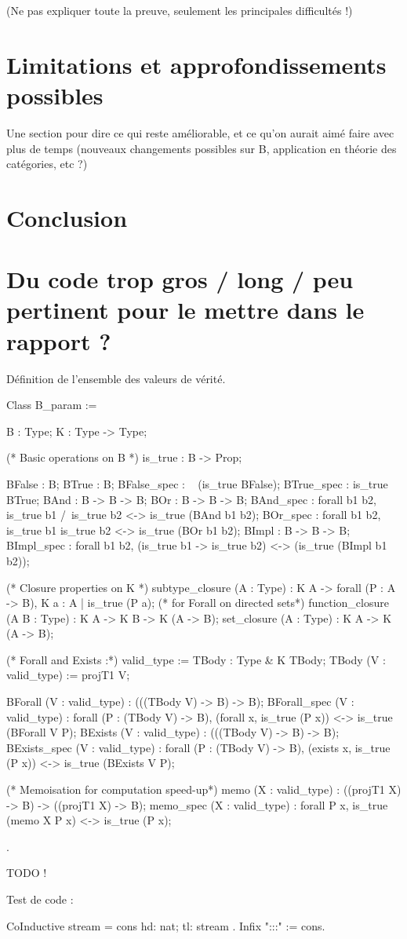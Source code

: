 \documentclass{article}
\theoremstyle{definition}
\begin{document}
(Ne pas expliquer toute la preuve, seulement les principales difficultés !)



\section{Limitations et approfondissements possibles}

Une section pour dire ce qui reste améliorable, et ce qu'on aurait aimé faire avec plus de temps (nouveaux changements possibles sur B, application en théorie des catégories, etc ?)


\section*{Conclusion}





\newpage

\appendix

\section{Du code trop gros / long / peu pertinent pour le mettre dans le rapport ?}
\label{todo}

Définition de l'ensemble des valeurs de vérité.
\begin{coq}
Class B_param := { B : Type;
  K : Type -> Type;
  
  (* Basic operations on B *)
  is_true : B -> Prop;
  
  BFalse : B;
  BTrue : B;
  BFalse_spec : ~ (is_true BFalse);
  BTrue_spec : is_true BTrue;
  BAnd : B -> B -> B;
  BOr : B -> B -> B;
  BAnd_spec : forall b1 b2, is_true b1 /\ is_true b2 <-> is_true (BAnd b1 b2);
  BOr_spec : forall b1 b2, is_true b1 \/ is_true b2 <-> is_true (BOr b1 b2);
  BImpl : B -> B -> B;
  BImpl_spec : forall b1 b2, (is_true b1 -> is_true b2) <-> (is_true (BImpl b1 b2));
  
  (* Closure properties on K *)
  subtype_closure (A : Type) : K A -> forall (P : A -> B), K {a : A | is_true (P a)}; (* for Forall on directed sets*)
  function_closure (A B : Type) : K A -> K B -> K (A -> B);
  set_closure (A : Type) : K A -> K (A -> B);

  (* Forall and Exists :*)
  valid_type := { TBody : Type & K TBody};
  TBody (V : valid_type) := projT1 V;
  
  BForall (V : valid_type) : (((TBody V) -> B) -> B);
  BForall_spec (V : valid_type) : forall (P : (TBody V) -> B), 
    (forall x, is_true (P x)) <-> is_true (BForall V P);
  BExists (V : valid_type) : (((TBody V) -> B) -> B);
  BExists_spec (V : valid_type) : forall (P : (TBody V) -> B), 
    (exists x, is_true (P x)) <-> is_true (BExists V P);
  
  
  (* Memoisation for computation speed-up*)
  memo (X : valid_type) : ((projT1 X) -> B) -> ((projT1 X) -> B);
  memo_spec (X : valid_type) : forall P x, is_true (memo X P x) <-> is_true (P x);
  }.
\end{coq}


TODO !

Test de code :

\begin{coq}
CoInductive stream = cons { hd: nat; tl: stream }.
Infix ":::" := cons.
\end{coq}
\end{document}
